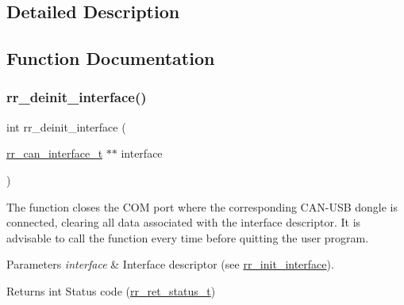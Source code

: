 \subsection{Detailed Description}


\subsection{Function Documentation}
\mbox{\label{group___init_ga10cbfcf4b80ebfd0d4df74441bbbe91a}} 
\subsubsection{\texorpdfstring{rr\+\_\+deinit\+\_\+interface()}{rr\_deinit\_interface()}}
{\footnotesize\ttfamily int rr\+\_\+deinit\+\_\+interface (\begin{DoxyParamCaption}\item[{\hyperlink{structrr__can__interface__t}{rr\+\_\+can\+\_\+interface\+\_\+t} $\ast$$\ast$}]{interface }\end{DoxyParamCaption})}



The function closes the C\+OM port where the corresponding C\+A\+N-\/\+U\+SB dongle is connected, clearing all data associated with the interface descriptor. It is advisable to call the function every time before quitting the user program. 


\begin{DoxyParams}{Parameters}
{\em interface} & Interface descriptor (see \hyperlink{group___init_ga472a4890dcc7d7a13123c56a06946d91}{rr\+\_\+init\+\_\+interface}). \\
\hline
\end{DoxyParams}
\begin{DoxyReturn}{Returns}
int Status code (\hyperlink{api_8h_a92d5be5038abcf89837faf85a08debdc}{rr\+\_\+ret\+\_\+status\+\_\+t}) 
\end{DoxyReturn}
\mbox{\label{group___init_gafebc52982ef705b8d0f805d5ee5ca9f7}} 
